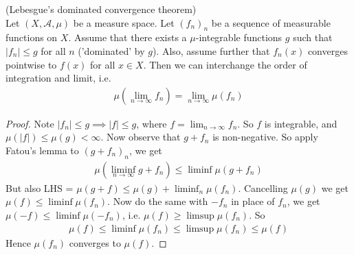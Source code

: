 \documentclass[a4paper]{article}
\begin{document}
\begin{thm} (Lebesgue's dominated convergence theorem)\\
Let $(X,\mathcal{A},\mu)$ be a measure space. Let $(f_n)_n$ be a sequence of measurable functions on $X$. Assume that there exists a $\mu$-integrable functions $g$ such that $|f_n | \leq g$ for all $n$ ('dominated' by $g$). Also, assume further that $f_n(x)$ converges pointwise to $f(x)$ for all $x \in X$. Then we can interchange the order of integration and limit, i.e.
\begin{equation*}
\begin{aligned}
\mu(\lim_{n \to \infty} f_n) = \lim_{n \to \infty} \mu (f_n)
\end{aligned}
\end{equation*}
\begin{proof}
Note $|f_n| \leq g \implies |f| \leq g$, where $f = \lim_{n \to \infty} f_n$. So $f$ is integrable, and $\mu(|f|) \leq \mu(g) < \infty$. Now observe that $g+f_n$ is non-negative. So apply Fatou's lemma to $(g+f_n)_n$, we get
\begin{equation*}
\begin{aligned}
\mu(\liminf_{n \to \infty} g+f_n) \leq \liminf \mu(g+f_n)
\end{aligned}
\end{equation*}
But also LHS = $\mu(g+f) \leq \mu(g) + \liminf_n \mu(f_n)$. Cancelling $\mu(g)$ we get $\mu(f) \leq \liminf \mu(f_n)$. Now do the same with $-f_n$ in place of $f_n$, we get $\mu(-f) \leq \liminf \mu(-f_n)$, i.e. $\mu(f) \geq \limsup \mu(f_n)$. So
\begin{equation*}
\begin{aligned}
\mu(f) \leq \liminf \mu(f_n) \leq \limsup \mu(f_n) \leq \mu(f)
\end{aligned}
\end{equation*}
Hence $\mu(f_n)$ converges to $\mu(f)$.
\end{proof}
\end{thm}
\end{document}
